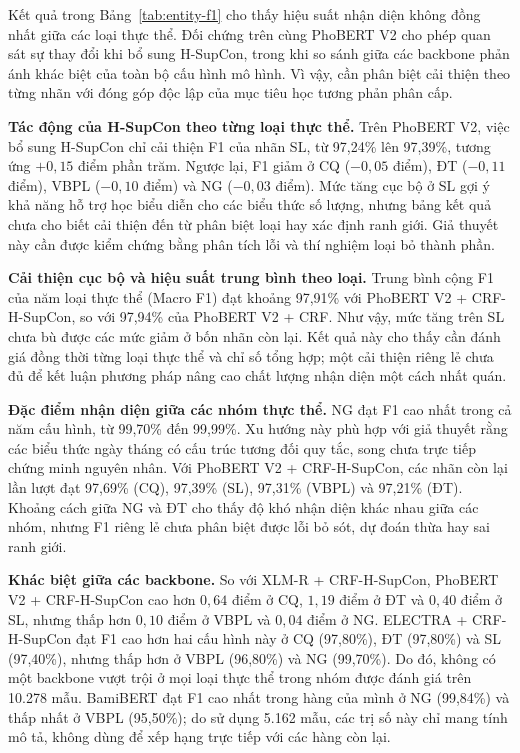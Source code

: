 \documentclass[conference,a4paper]{IEEEtran}
\begin{document}
Kết quả trong Bảng~\ref{tab:entity-f1} cho thấy hiệu suất nhận diện không
đồng nhất giữa các loại thực thể. Đối chứng trên cùng PhoBERT V2 cho phép
quan sát sự thay đổi khi bổ sung H-SupCon, trong khi so sánh giữa các
backbone phản ánh khác biệt của toàn bộ cấu hình mô hình. Vì vậy, cần
phân biệt cải thiện theo từng nhãn với đóng góp độc lập của mục tiêu
học tương phản phân cấp.

\noindent\textbf{Tác động của H-SupCon theo từng loại thực thể.}
Trên PhoBERT V2, việc bổ sung H-SupCon chỉ cải thiện F1 của nhãn SL,
từ 97,24\% lên 97,39\%, tương ứng $+0{,}15$ điểm phần trăm. Ngược lại,
F1 giảm ở CQ ($-0{,}05$ điểm), ĐT ($-0{,}11$ điểm), VBPL
($-0{,}10$ điểm) và NG ($-0{,}03$ điểm). Mức tăng cục bộ ở SL gợi ý
khả năng hỗ trợ học biểu diễn cho các biểu thức số lượng, nhưng bảng
kết quả chưa cho biết cải thiện đến từ phân biệt loại hay xác định
ranh giới. Giả thuyết này cần được kiểm chứng bằng phân tích lỗi và
thí nghiệm loại bỏ thành phần.

\noindent\textbf{Cải thiện cục bộ và hiệu suất trung bình theo loại.}
Trung bình cộng F1 của năm loại thực thể (Macro F1) đạt khoảng 97,91\%
với PhoBERT V2 + CRF-H-SupCon, so với 97,94\% của PhoBERT V2 + CRF.
Như vậy, mức tăng trên SL chưa bù được các mức giảm ở bốn nhãn còn lại.
Kết quả này cho thấy cần đánh giá đồng thời từng loại thực thể và chỉ
số tổng hợp; một cải thiện riêng lẻ chưa đủ để kết luận phương pháp
nâng cao chất lượng nhận diện một cách nhất quán.

\noindent\textbf{Đặc điểm nhận diện giữa các nhóm thực thể.}
NG đạt F1 cao nhất trong cả năm cấu hình, từ 99,70\% đến 99,99\%.
Xu hướng này phù hợp với giả thuyết rằng các biểu thức ngày tháng có
cấu trúc tương đối quy tắc, song chưa trực tiếp chứng minh nguyên nhân.
Với PhoBERT V2 + CRF-H-SupCon, các nhãn còn lại lần lượt đạt 97,69\%
(CQ), 97,39\% (SL), 97,31\% (VBPL) và 97,21\% (ĐT).
Khoảng cách giữa NG và ĐT cho thấy độ khó nhận diện khác nhau giữa các
nhóm, nhưng F1 riêng lẻ chưa phân biệt được lỗi bỏ sót, dự đoán thừa
hay sai ranh giới.

\noindent\textbf{Khác biệt giữa các backbone.}
So với XLM-R + CRF-H-SupCon, PhoBERT V2 + CRF-H-SupCon cao hơn
$0{,}64$ điểm ở CQ, $1{,}19$ điểm ở ĐT và $0{,}40$ điểm ở SL,
nhưng thấp hơn $0{,}10$ điểm ở VBPL và $0{,}04$ điểm ở NG.
ELECTRA + CRF-H-SupCon đạt F1 cao hơn hai cấu hình này ở CQ (97,80\%),
ĐT (97,80\%) và SL (97,40\%), nhưng thấp hơn ở VBPL (96,80\%) và
NG (99,70\%). Do đó, không có một backbone vượt trội ở mọi loại
thực thể trong nhóm được đánh giá trên 10.278 mẫu. BamiBERT đạt F1
cao nhất trong hàng của mình ở NG (99,84\%) và thấp nhất ở VBPL
(95,50\%); do sử dụng 5.162 mẫu, các trị số này chỉ mang tính mô tả,
không dùng để xếp hạng trực tiếp với các hàng còn lại.
\end{document}
